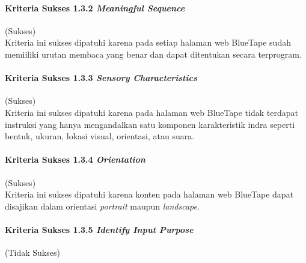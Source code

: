 \paragraph{Kriteria Sukses 1.3.2 \textit{Meaningful Sequence}}
\label{par:kepatuhan_bluetape_kriteria_sukses_1.3.2}
(Sukses)\\

Kriteria ini sukses dipatuhi karena pada setiap halaman web BlueTape sudah memiiliki urutan membaca yang benar dan dapat ditentukan secara terprogram. 

\paragraph{Kriteria Sukses 1.3.3 \textit{Sensory Characteristics}}
\label{par:kepatuhan_bluetape_kriteria_sukses_1.3.3}
(Sukses)\\

Kriteria ini sukses dipatuhi karena pada halaman web BlueTape tidak terdapat instruksi yang hanya mengandalkan satu komponen karakteristik indra seperti bentuk, ukuran, lokasi visual, orientasi,
atau suara.

\paragraph{Kriteria Sukses 1.3.4 \textit{Orientation}}
\label{par:kepatuhan_bluetape_kriteria_sukses_1.3.4}
(Sukses)\\

Kriteria ini sukses dipatuhi karena konten pada halaman web BlueTape dapat disajikan dalam orientasi \textit{portrait} maupun \textit{landscape}.

\paragraph{Kriteria Sukses 1.3.5 \textit{Identify Input Purpose}}
\label{par:kepatuhan_bluetape_kriteria_sukses_1.3.5}
(Tidak Sukses)\\

